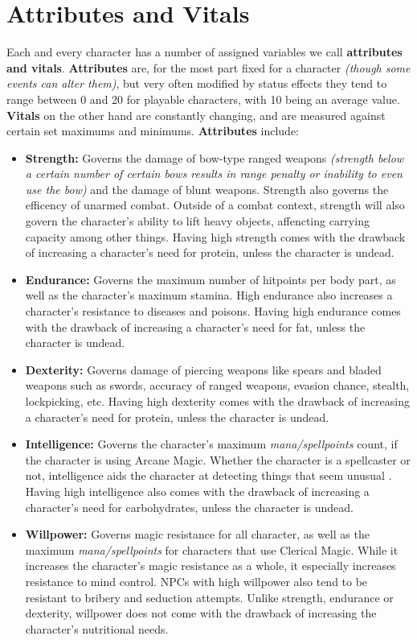 \section{Attributes and Vitals}
Each and every character has a number of assigned variables we call \textbf{attributes and vitals}. \textbf{Attributes} are, for the most part fixed for a character \textit{(though some events can alter them)}, but very often modified by status effects \textemdash they tend to range between 0 and 20 for playable characters, with 10 being an average value. \textbf{Vitals} on the other hand are constantly changing, and are measured against certain set maximums and minimums.\newline
\textbf{Attributes} include:
\begin{itemize}
\item \textbf{Strength:} Governs the damage of bow-type ranged weapons \textit{(strength below a certain number of certain bows results in range penalty or inability to even use the bow)} and the damage of blunt weapons. Strength also governs the efficency of unarmed combat. Outside of a combat context, strength will also govern the character's ability to lift heavy objects, affencting carrying capacity among other things. Having high strength comes with the drawback of increasing a character's need for protein, unless the character is undead.
\item \textbf{Endurance:} Governs the maximum number of hitpoints per body part, as well as the character's maximum stamina. High endurance also increases a character's resistance to diseases and poisons. Having high endurance comes with the drawback of increasing a character's need for fat, unless the character is undead.
\item \textbf{Dexterity:} Governs damage of piercing weapons like spears and bladed weapons such as swords, accuracy of ranged weapons, evasion chance, stealth, lockpicking, etc. Having high dexterity comes with the drawback of increasing a character's need for protein, unless the character is undead.
\item \textbf{Intelligence:} Governs the character's maximum \textit{mana/spellpoints} count, if the character is using Arcane Magic. Whether the character is a spellcaster or not, intelligence aids the character at detecting things that seem unusual . Having high intelligence also comes with the drawback of increasing a character's need for carbohydrates, unless the character is undead.
\item \textbf{Willpower:} Governs magic resistance for all character, as well as the maximum \textit{mana/spellpoints} for characters that use Clerical Magic. While it increases the character's magic resistance as a whole, it especially increases resistance to mind control. NPCs with high willpower also tend to be resistant to bribery and seduction attempts. Unlike strength, endurance or dexterity, willpower does not come with the drawback of increasing the character's nutritional needs.

\end{itemize}
